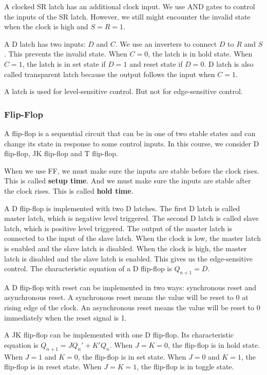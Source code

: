 \documentclass[a4paper,12pt]{article}
\begin{document}
A clocked SR latch has an additional clock input.
We use AND gates to control the inputs of the SR latch.
However, we still might encounter the invalid state when the clock is high and $S = R = 1$.

A D latch has two inputs: $D$ and $C$.
We use an inverters to connect $D$ to $R$ and $S$.
This prevents the invalid state.
When $C = 0$, the latch is in hold state.
When $C = 1$, the latch is in set state if $D = 1$ and reset state if $D = 0$.
D latch is also called transparent latch because the output follows the input when $C = 1$.

A latch is used for level-sensitive control.
But not for edge-sensitive control.

\subsubsection{Flip-Flop}

A flip-flop is a sequential circuit that can be in one of two stable states and can change its state in response to some control inputs.
In this course, we consider D flip-flop, JK flip-flop and T flip-flop.

When we use FF, we must make sure the inputs are stable before the clock rises.
This is called \textbf{setup time}.
And we must make sure the inputs are stable after the clock rises.
This is called \textbf{hold time}.

A D flip-flop is implemented with two D latches.
The first D latch is called master latch, which is negative level triggered.
The second D latch is called slave latch, which is positive level triggered.
The output of the master latch is connected to the input of the slave latch.
When the clock is low, the master latch is enabled and the slave latch is disabled.
When the clock is high, the master latch is disabled and the slave latch is enabled.
This gives us the edge-sensitive control.
The characteristic equation of a D flip-flop is $Q_{n+1} = D$.

A D flip-flop with reset can be implemented in two ways: synchronous reset and asynchronous reset.
A synchronous reset means the value will be reset to 0 at rising edge of the clock.
An asynchronous reset means the value will be reset to 0 immediately when the reset signal is 1.

A JK flip-flop can be implemented with one D flip-flop.
Its characteristic equation is $Q_{n+1} = JQ_n' + K'Q_n$.
When $J = K = 0$, the flip-flop is in hold state.
When $J = 1$ and $K = 0$, the flip-flop is in set state.
When $J = 0$ and $K = 1$, the flip-flop is in reset state.
When $J = K = 1$, the flip-flop is in toggle state.
\end{document}

